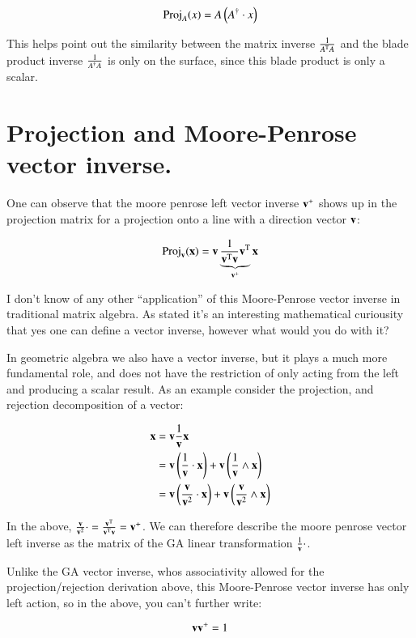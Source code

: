 \documentclass{article}      %
\newcommand{\T}[0]{\text{T}}
\begin{document}
\[
\operatorname{Proj}_A(x) = A \left(A^\dagger \cdot x\right)
\]

This helps point out the similarity between the matrix inverse $\inv{A^\T A}$ and the blade product inverse $\frac{1}{{A^\dagger}A}$ is only on the surface,
since this blade product is only a scalar.

\section{ Projection and Moore-Penrose vector inverse. }

One can observe that the moore penrose left vector inverse $\mathbf{v}^+$ shows up in the projection matrix for a projection onto a line with a direction vector $\mathbf{v}$:

\begin{equation}
\Proj_\Bv(\Bx) = \Bv \underbrace{\inv{ \Bv^\T \Bv} \Bv^\T}_{\Bv^+} \Bx
\end{equation}

I don't know of any other ``application'' of this Moore-Penrose vector inverse in traditional matrix algebra.  As stated it's an interesting mathematical curiousity that yes one can define a vector inverse, however what would you do with it?

In geometric algebra we also have a vector inverse, but it plays a much more fundamental role, and does not have the restriction of only acting from the left and 
producing a scalar result.  As an example consider the projection, and rejection decomposition of a vector:

\begin{align*}
\mathbf{x} 
&= \mathbf{v} \frac{1}{\mathbf{v}} \mathbf{x} \\
&= \mathbf{v} \left(\frac{1}{\mathbf{v}} \cdot \mathbf{x}\right) + \mathbf{v} \left(\frac{1}{\mathbf{v}} \wedge \mathbf{x}\right) \\
&= \mathbf{v} 
\left(
\frac{\mathbf{v}}{\mathbf{v}^2} \cdot 
 \mathbf{x}\right)
 + \mathbf{v} \left(\frac{\mathbf{v}}{\mathbf{v}^2} \wedge \mathbf{x}\right) \\
\end{align*}

In the above, $\frac{\Bv}{\Bv^2} \cdot = \frac{\Bv^\T}{\Bv^\T \Bv} = \Bv^+$.  We can therefore describe the moore penrose vector left inverse as the matrix of the GA linear transformation $\frac{1}{\mathbf{v}} \cdot$.

Unlike the GA vector inverse, whos associativity allowed for the projection/rejection derivation above, this Moore-Penrose vector inverse has only left action, so in the above, you can't further write:

\[
\mathbf{v} \mathbf{v}^{+} = 1
\]
\end{document}
